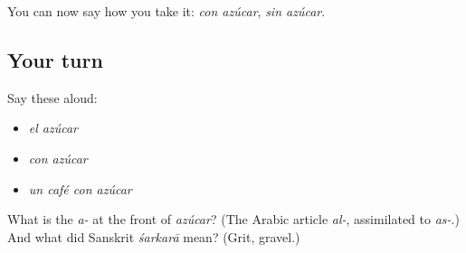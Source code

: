 \begin{grammarlens}[title={What you've built}]
You can now say how you take it: \emph{con azúcar}, \emph{sin azúcar}.
\end{grammarlens}

\subsection*{Your turn}
Say these aloud:

\begin{itemize}
\raggedright
  \item \emph{el azúcar}
  \item \emph{con azúcar}
  \item \emph{un café con azúcar}
\end{itemize}

\begin{tcolorbox}[breakable,colback=teal!4,colframe=teal!35!black,title={Before you move on}]
What is the \emph{a-} at the front of \emph{azúcar}? (The Arabic article \emph{al-}, assimilated to \emph{as-}.) And what did Sanskrit \emph{śarkarā} mean? (Grit, gravel.)
\end{tcolorbox}
